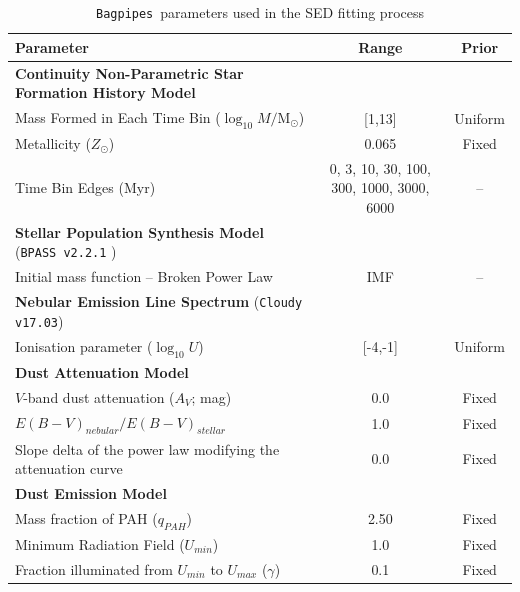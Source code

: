 \documentclass[twocolumn,tight,times,linenumbers]{aastex631}
\newcommand{\bagpipes}{\texttt{Bagpipes}}
\begin{document}
		\begin{table}
			\caption{\bagpipes~parameters used in the SED fitting process}
			\label{table:bagpipes}
			\centering
			\begin{tabular*}{\textwidth}{@{\extracolsep{\fill}}lcc}
				\hline
				Parameter & Range & Prior \\
				\hline
				\textbf{Continuity Non-Parametric Star Formation History Model} \citep{Leja2019} & & \\
				Mass Formed in Each Time Bin ($\log_{10} M/$M$_\odot$)  & [1,13] & Uniform\\
				Metallicity ($Z_\odot$)                &   0.065     & Fixed \\
				Time Bin Edges (Myr) & 0, 3, 10, 30, 100, 300, 1000, 3000, 6000 & -- \\
				\hline
				\textbf{Stellar Population Synthesis Model} (\texttt{BPASS v2.2.1} \citealt{Stanway2018})       &                                        &  \\
				Initial mass function -- Broken Power Law			&  IMF          					   & -- \\
				\hline
				\textbf{Nebular Emission Line Spectrum} (\texttt{Cloudy v17.03}) & & \\
				Ionisation parameter ($\log_{10} U$)	              & [-4,-1] &  Uniform \\		 
				\hline
				\textbf{Dust Attenuation Model} \citep{Calzetti2000}    &  &\\ 
				$V$-band dust attenuation ($A_V$; mag) & 0.0  & Fixed \\
				$E(B-V)_{nebular}/E(B-V)_{stellar}$ & 1.0 & Fixed \\
				Slope delta of the power law modifying the attenuation curve &  0.0 & Fixed \\
				\hline
				\textbf{Dust Emission Model} \citep{Draine2014} & & \\
				Mass fraction of PAH ($q_{PAH}$)			&  2.50 & Fixed \\
				Minimum Radiation Field ($U_{min}$)        &   1.0 & Fixed \\
				Fraction illuminated from $U_{min}$ to $U_{max}$ ($\gamma$)           &    0.1  & Fixed\\
				\hline
			\end{tabular*}
		\end{table}
		

    	

	
\end{document}
